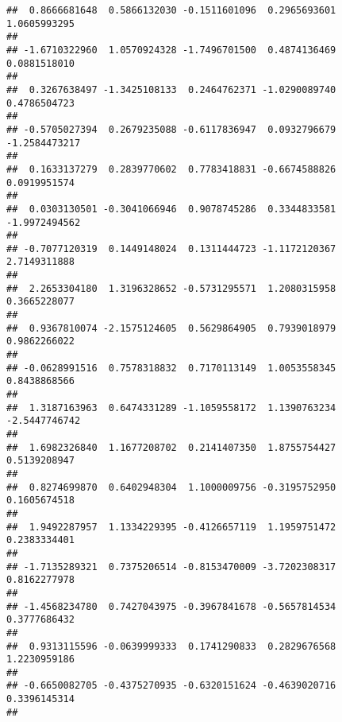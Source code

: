 \documentclass[]{article}
\begin{document}
\begin{verbatim}
##  0.8666681648  0.5866132030 -0.1511601096  0.2965693601  1.0605993295 
##                                                                       
## -1.6710322960  1.0570924328 -1.7496701500  0.4874136469  0.0881518010 
##                                                                       
##  0.3267638497 -1.3425108133  0.2464762371 -1.0290089740  0.4786504723 
##                                                                       
## -0.5705027394  0.2679235088 -0.6117836947  0.0932796679 -1.2584473217 
##                                                                       
##  0.1633137279  0.2839770602  0.7783418831 -0.6674588826  0.0919951574 
##                                                                       
##  0.0303130501 -0.3041066946  0.9078745286  0.3344833581 -1.9972494562 
##                                                                       
## -0.7077120319  0.1449148024  0.1311444723 -1.1172120367  2.7149311888 
##                                                                       
##  2.2653304180  1.3196328652 -0.5731295571  1.2080315958  0.3665228077 
##                                                                       
##  0.9367810074 -2.1575124605  0.5629864905  0.7939018979  0.9862266022 
##                                                                       
## -0.0628991516  0.7578318832  0.7170113149  1.0053558345  0.8438868566 
##                                                                       
##  1.3187163963  0.6474331289 -1.1059558172  1.1390763234 -2.5447746742 
##                                                                       
##  1.6982326840  1.1677208702  0.2141407350  1.8755754427  0.5139208947 
##                                                                       
##  0.8274699870  0.6402948304  1.1000009756 -0.3195752950  0.1605674518 
##                                                                       
##  1.9492287957  1.1334229395 -0.4126657119  1.1959751472  0.2383334401 
##                                                                       
## -1.7135289321  0.7375206514 -0.8153470009 -3.7202308317  0.8162277978 
##                                                                       
## -1.4568234780  0.7427043975 -0.3967841678 -0.5657814534  0.3777686432 
##                                                                       
##  0.9313115596 -0.0639999333  0.1741290833  0.2829676568  1.2230959186 
##                                                                       
## -0.6650082705 -0.4375270935 -0.6320151624 -0.4639020716  0.3396145314 
##                                                                       

\end{verbatim}
\end{document}
